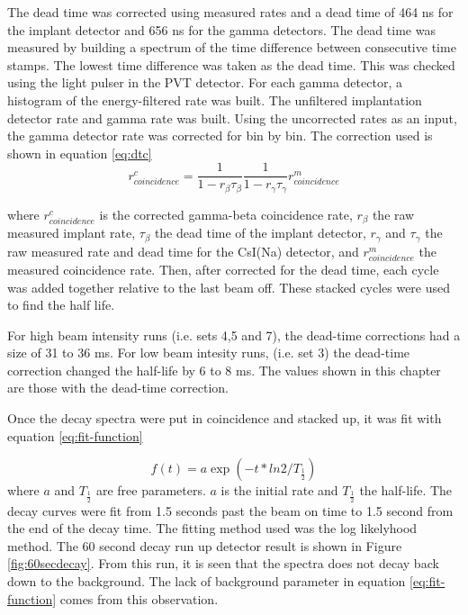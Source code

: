 The dead time was corrected using measured rates and a dead time of 464 ns for the implant detector and 656 ns for the gamma detectors.  
The dead time was measured by building a spectrum of the time difference between consecutive time stamps.
The lowest time difference was taken as the dead  time. 
This was checked using the light pulser in the PVT detector.
For each gamma detector, a histogram of the energy-filtered rate was built.
The unfiltered implantation detector rate and gamma rate was built.
Using the uncorrected rates as an input, the gamma detector rate was corrected for bin by bin.
The correction used is shown in equation \ref{eq:dtc}
%
\begin{equation}
r^{c}_{coincidence} = \frac{1}{1 - r_{\beta}\tau_{\beta}}\frac{1}{1 - r_{\gamma}\tau_{\gamma}}r^{m}_{coincidence} 
	\label{eq:dtc} 
\end{equation}
%

where $r^{c}_{coincidence}$ is the corrected gamma-beta coincidence rate, $r_{\beta}$ the raw measured implant rate, $\tau_{\beta}$ the dead time of the implant detector, $r_{\gamma}$ and $\tau_{\gamma}$ the raw measured rate and dead time for the CsI(Na) detector, and $r^{m}_{coincidence}$ the measured coincidence rate.   
Then, after corrected for the dead time, each cycle was added together relative to the last beam off.
These stacked cycles were used to find the half life.

For high beam intensity runs (i.e. sets 4,5 and 7), the dead-time corrections had a size of 31 to 36 ms.
For low beam intesity runs, (i.e. set 3) the dead-time correction changed the half-life by 6 to 8 ms. 
The values shown in this chapter are those with the dead-time correction.

Once the decay spectra were put in coincidence and stacked up, it was fit with equation \ref{eq:fit-function}

%
\begin{equation}
	f(t) = a\exp{(-t*ln2/T_{\frac{1}{2}})}
	\label{eq:fit-function}
\end{equation}
%
where $a$ and $T_{\frac{1}{2}}$ are free parameters.
$a$ is the initial rate and $T_{\frac{1}{2}}$ the half-life.
The decay curves were fit from 1.5 seconds past the beam on time to 1.5 second from the end of the decay time. 
The fitting method used was the log likelyhood method. 
The 60 second decay run up detector result is shown in Figure \ref{fig:60secdecay}.
From this run, it is seen that the spectra does not decay back down to the background. 
The lack of background parameter in equation \ref{eq:fit-function} comes from this observation. 


